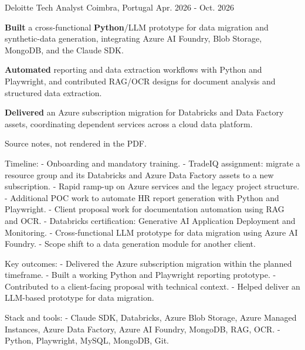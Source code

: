 \begin{cventries}

  \cventry
    {Deloitte} %
    {Tech Analyst} %
    {Coimbra, Portugal} %
    {Apr. 2026 - Oct. 2026} %
    {
      \begin{cvitems} %
        \item {\textbf{Built} a cross-functional \textbf{Python}/LLM prototype for data migration and synthetic-data generation, integrating Azure AI Foundry, Blob Storage, MongoDB, and the Claude SDK.}
        \item {\textbf{Automated} reporting and data extraction workflows with Python and Playwright, and contributed RAG/OCR designs for document analysis and structured data extraction.}
        \item {\textbf{Delivered} an Azure subscription migration for Databricks and Data Factory assets, coordinating dependent services across a cloud data platform.}
      \end{cvitems}
    } %
    {
      Source notes, not rendered in the PDF.

      Timeline:
      - Onboarding and mandatory training.
      - TradeIQ assignment: migrate a resource group and its Databricks and Azure Data Factory assets to a new subscription.
      - Rapid ramp-up on Azure services and the legacy project structure.
      - Additional POC work to automate HR report generation with Python and Playwright.
      - Client proposal work for documentation automation using RAG and OCR.
      - Databricks certification: Generative AI Application Deployment and Monitoring.
      - Cross-functional LLM prototype for data migration using Azure AI Foundry.
      - Scope shift to a data generation module for another client.

      Key outcomes:
      - Delivered the Azure subscription migration within the planned timeframe.
      - Built a working Python and Playwright reporting prototype.
      - Contributed to a client-facing proposal with technical context.
      - Helped deliver an LLM-based prototype for data migration.

      Stack and tools:
      - Claude SDK, Databricks, Azure Blob Storage, Azure Managed Instances, Azure Data Factory, Azure AI Foundry, MongoDB, RAG, OCR.
      - Python, Playwright, MySQL, MongoDB, Git.

}
\end{cventries}
